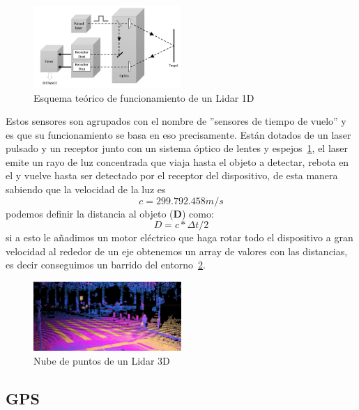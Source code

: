 \begin{figure}[h]
    \centering
    \includegraphics[width=0.5\textwidth]{images/lidar_explicacion.png}
    \caption{Esquema teórico de funcionamiento de un Lidar 1D}
    \label{fig:lidar_explicacion}
\end{figure}

Estos sensores son agrupados con el nombre de ''sensores de tiempo de vuelo'' y es que su funcionamiento se basa en eso precisamente. Están 
dotados de un laser pulsado y un receptor junto con un sistema óptico de lentes y espejos~\ref{fig:lidar_explicacion}, el laser emite un rayo de luz concentrada que viaja 
hasta el objeto a detectar, rebota en el y vuelve hasta ser detectado por el receptor del dispositivo, de esta manera sabiendo que la 
velocidad de la luz es~$$c=299.792.458 m/s$$ podemos definir la distancia al objeto (\textbf{D}) como:~$$D = c * \Delta{t} / 2$$ si a esto 
le añadimos un motor eléctrico que haga rotar todo el dispositivo a gran velocidad al rededor de un eje obtenemos un array de valores con 
las distancias, es decir conseguimos un barrido del entorno~\ref{fig:lidar3d}.


\begin{figure}[h]
    \centering
    \includegraphics[width=0.5\textwidth]{images/Pointcloud-from-Ouster-lidar-Copyright-C-Ouster-4.png}
    \caption{Nube de puntos de un Lidar 3D}
    \label{fig:lidar3d}
\end{figure}
\newpage

\subsection{GPS}

